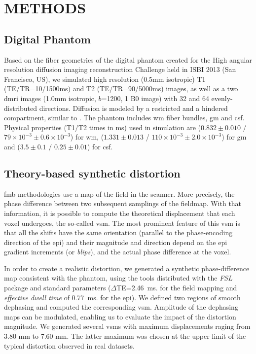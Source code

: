 \section{METHODS}

\subsection{Digital Phantom}
Based on the fiber geometries of the digital phantom 
created for the High angular resolution diffusion imaging 
reconstruction Challenge held in ISBI 2013 
(San Francisco, US), we simulated high resolution 
(0.5mm isotropic) T1 (TE/TR=10/1500ms) and T2 
(TE/TR=90/5000ms) images, as well as a two \gls*{dmri}
images (1.0mm isotropic, $b$=1200, 1 B0 image) with
32 and 64 evenly-distributed directions.
Diffusion is modeled by a restricted and a hindered
compartment, similar to \cite{assaf_composite_2005}.
The phantom includes \gls*{wm} fiber bundles,
\gls*{gm} and \gls*{csf}. Physical properties
(T1/T2 times in ms) used in simulation are
($0.832\pm0.010$ / $79\times10^{-3}\pm0.6\times10^{-3}$)
for \gls*{wm},
($1.331\pm0.013$ / $110\times10^{-3}\pm2.0\times10^{-3}$) for
\gls*{gm} and ($3.5\pm0.1$ / $0.25\pm0.01$) for \gls*{csf}.

\subsection{Theory-based synthetic distortion}
\label{sec:distortion}
\Gls*{fmb} methodologies use a map
of the field in the scanner. More precisely, the
phase difference between two subsequent samplings
of the fieldmap. With that information, it is possible
to compute the theoretical displacement that each
voxel undergoes, the so-called \gls*{vsm}. The
most prominent feature of this \gls*{vsm} is that all
the shifts have the same orientation (parallel to the
phase-encoding direction of the \gls*{epi}) and their
magnitude and direction depend on the \gls*{epi} 
gradient increments (or \emph{blips}), and the actual
phase difference at the voxel.

In order to create a realistic distortion, we
generated a synthetic phase-difference map 
consistent with the phantom, using the 
tools distributed with the \emph{FSL} package 
\cite{jenkinson_fsl_2012}  and
standard parameters ($\Delta$TE=2.46~ms. for the
field mapping and \emph{effective dwell time} of 
0.77~ms. for the \gls*{epi}).
We defined two regions of smooth dephasing and 
computed the corresponding \gls*{vsm}. Amplitude
of the dephasing maps can be modulated, enabling
us to evaluate the impact of the distortion magnitude.
We generated several \glspl*{vsm} with maximum
displacements raging from 3.80 mm to 7.60 mm. The
latter maximum was chosen at the upper limit of the
typical distortion observed in real datasets.

